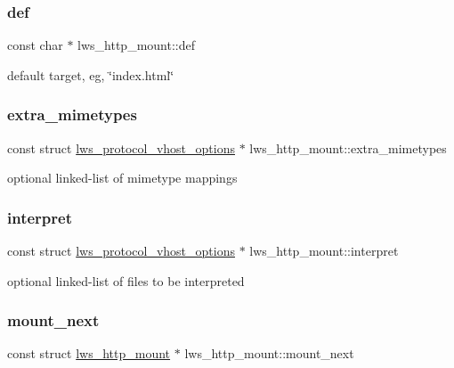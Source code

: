 \subsubsection{\texorpdfstring{def}{def}}
{\footnotesize\ttfamily const char $\ast$ lws\+\_\+http\+\_\+mount\+::def}

default target, eg, \char`\"{}index.\+html\char`\"{} \mbox{\label{structlws__http__mount_a73455cf51d91943f6302c0993f66ddd8}} 
\subsubsection{\texorpdfstring{extra\+\_\+mimetypes}{extra\_mimetypes}}
{\footnotesize\ttfamily const struct \hyperlink{structlws__protocol__vhost__options}{lws\+\_\+protocol\+\_\+vhost\+\_\+options} $\ast$ lws\+\_\+http\+\_\+mount\+::extra\+\_\+mimetypes}

optional linked-\/list of mimetype mappings \mbox{\label{structlws__http__mount_ac2244552114c206f814cb72a59fc302f}} 
\subsubsection{\texorpdfstring{interpret}{interpret}}
{\footnotesize\ttfamily const struct \hyperlink{structlws__protocol__vhost__options}{lws\+\_\+protocol\+\_\+vhost\+\_\+options} $\ast$ lws\+\_\+http\+\_\+mount\+::interpret}

optional linked-\/list of files to be interpreted \mbox{\label{structlws__http__mount_aeb1b5e12e879ae64c14b30cffdf8d4e7}} 
\subsubsection{\texorpdfstring{mount\+\_\+next}{mount\_next}}
{\footnotesize\ttfamily const struct \hyperlink{structlws__http__mount}{lws\+\_\+http\+\_\+mount} $\ast$ lws\+\_\+http\+\_\+mount\+::mount\+\_\+next}

